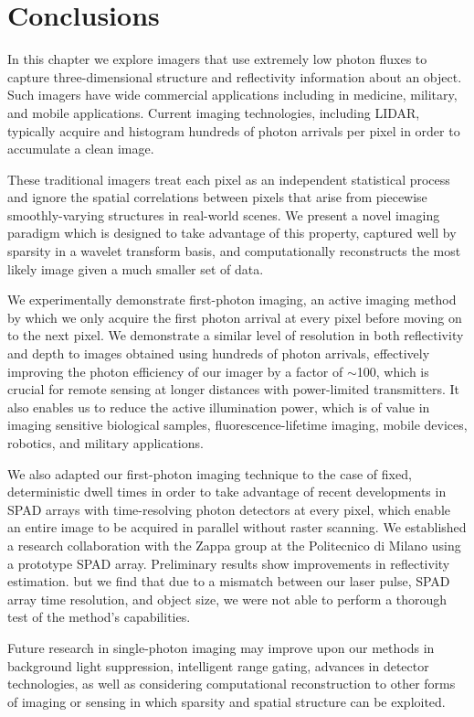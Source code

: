 \section{Conclusions}

In this chapter we explore imagers that use extremely low photon fluxes to capture three-dimensional structure and reflectivity information about an object. Such imagers have wide commercial applications including in medicine, military, and mobile applications. Current imaging technologies, including LIDAR, typically acquire and histogram hundreds of photon arrivals per pixel in order to accumulate a clean image.

These traditional imagers treat each pixel as an independent statistical process and ignore the spatial correlations between pixels that arise from piecewise smoothly-varying structures in real-world scenes. We present a novel imaging paradigm which is designed to take advantage of this property, captured well by sparsity in a wavelet transform basis, and computationally reconstructs the most likely image given a much smaller set of data.

We experimentally demonstrate first-photon imaging, an active imaging method by which we only acquire the first photon arrival at every pixel before moving on to the next pixel. We demonstrate a similar level of resolution in both reflectivity and depth to images obtained using hundreds of photon arrivals, effectively improving the photon efficiency of our imager by a factor of $\sim$100, which is crucial for remote sensing at longer distances with power-limited transmitters. It also enables us to reduce the active illumination power, which is of value in imaging sensitive biological samples, fluorescence-lifetime imaging, mobile devices, robotics, and military applications.

We also adapted our first-photon imaging technique to the case of fixed, deterministic dwell times in order to take advantage of recent developments in SPAD arrays with time-resolving photon detectors at every pixel, which enable an entire image to be acquired in parallel without raster scanning. We established a research collaboration with the Zappa group at the Politecnico di Milano using a prototype SPAD array. Preliminary results show improvements in reflectivity estimation. but we find that due to a mismatch between our laser pulse, SPAD array time resolution, and object size, we were not able to perform a thorough test of the method's capabilities.

Future research in single-photon imaging may improve upon our methods in background light suppression, intelligent range gating, advances in detector technologies, as well as considering computational reconstruction to other forms of imaging or sensing in which sparsity and spatial structure can be exploited.


